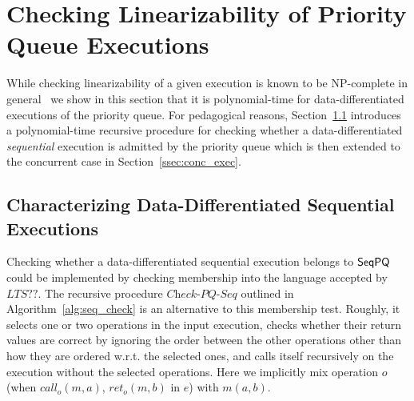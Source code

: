 \section{Checking Linearizability of Priority Queue Executions}
\label{sec:checking inclusion by recursive procedure}

While checking linearizability of a given execution is known to be NP-complete in general~\cite{journals/siamcomp/GibbonsK97} we show in this section that it is polynomial-time for data-differentiated executions of the priority queue. For pedagogical reasons, Section~\ref{ssec:seq_exec} introduces a polynomial-time recursive procedure for checking whether a data-differentiated \emph{sequential} execution is admitted by the priority queue which is then extended to the concurrent case in Section~\ref{ssec:conc_exec}.

\subsection{Characterizing Data-Differentiated Sequential Executions}\label{ssec:seq_exec}

Checking whether a data-differentiated sequential execution belongs to $\mathsf{SeqPQ}$ could be implemented by checking membership into the language accepted by $LTS??$. The recursive procedure $\textit{Check-PQ-Seq}$ outlined in Algorithm~\ref{alg:seq_check} is an alternative to this membership test. Roughly, it selects one or two operations in the input execution, checks whether their return values are correct by ignoring the order between the other operations other than how they are ordered w.r.t. the selected ones, and calls itself recursively on the execution without the selected operations. {\color {blue} Here we implicitly mix operation $o$ (when $\textit{call}_o(m,a)$, $\textit{ret}_o(m,b)$ in $e$) with $m(a,b)$.} 

